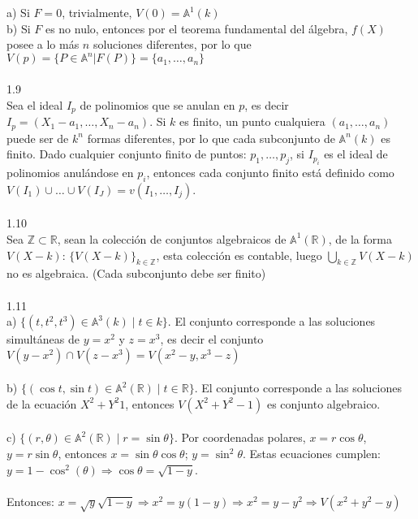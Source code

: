 \documentclass{article}
\newcommand{\R}{\mathbb{R}}
\newcommand{\A}{\mathbb{A}}
\newcommand{\Z}{\mathbb{Z}}
\begin{document}
\\
\\
a) Si $F=0$, trivialmente, $V(0)=\mathbb{A}^{1}(k)$
\\
b) Si $F$ es no nulo, entonces por el teorema fundamental del álgebra, $f(X)$ posee a lo más $n$ soluciones diferentes, por lo que $V(p)=\{P \in \mathbb{A}^{n} | F(P) \}=\{ a_1,\dots,a_n\}$
\\
\\
1.9
\\
Sea el ideal $I_p$ de polinomios que se anulan en $p$, es decir $I_p=(X_1-a_1, \dots , X_n - a_n)$. Si $k$ es finito, un punto cualquiera $(a_1,\dots,a_n)$ puede ser de $k^n$ formas diferentes, por lo que cada subconjunto de $\mathbb{A}^{n}(k)$ es finito. Dado cualquier conjunto finito de puntos: $p_1,\dots,p_j$, si $I_{p_{i}}$ es el ideal de polinomios anulándose en $p_i$, entonces cada conjunto finito está definido como $V(I_1)\cup \dots \cup V(I_J)=v(I_1,\dots,I_j)$.
\\
\\
1.10
\\
Sea $\mathbb{Z} \subset \mathbb{R}$, sean la colección de conjuntos algebraicos de $\mathbb{A}^{1}(\mathbb{R})$, de la forma $V(X-k)$: $\{V(X-k) \}_{k \in \Z}$, esta  colección es contable, luego $\bigcup_{k \in \Z} V(X-k)$ no es algebraica. (Cada subconjunto debe ser finito)
\\
\\
1.11
\\
a) $\{ (t,t^{2},t^{3}) \in \A^{3}(k) \mid t \in k\}$. El conjunto corresponde a las soluciones simultáneas de $y=x^{2}$ y $z=x^3$, es decir el conjunto $V(y-x^{2}) \cap V(z-x^{3})=V(x^{2}-y,x^{3}-z)$
\\
\\
b) $\{ (\cos{t},\sin{t}) \in \A^{2}(\R) \mid t \in \R \}$. El conjunto corresponde a las soluciones de la ecuación $X^2 + Y^2 1$, entonces $V(X^2 +Y^2 -1)$ es conjunto algebraico.
\\
\\
c) $\{(r,\theta) \in \A^{2}(\R) \mid r=\sin{\theta} \}$. Por coordenadas polares, $x=r\cos{\theta}$, $y=r\sin{\theta}$, entonces $x=\sin{\theta} \cos{\theta}$; $y= \sin^{2}{\theta}$. Estas ecuaciones cumplen: $y=1-\cos^{2}(\theta) \Longrightarrow \cos{\theta}=\sqrt{1-y}$.
\\
\\
Entonces: $x=\sqrt{y}\sqrt{1-y} \Longrightarrow x^{2}=y(1-y) \Longrightarrow x^{2}=y-y^{2} \Longrightarrow V(x^{2}+y^{2}-y)$
\\
\end{document}
